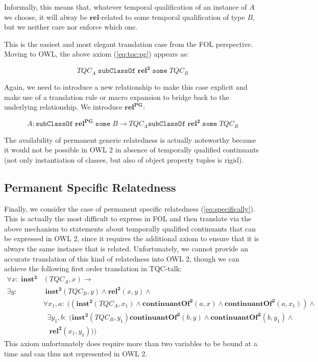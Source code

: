 \documentclass{ao2e}
\newcommand{\mirel}[1]{\ensuremath{\mathrm{\mathbf{#1}}}}
\newcommand{\mclass}[1]{\ensuremath{\mathit{#1}}}
\newcommand{\mrel}[2]{\mirel{#1^#2}}
\newcommand{\mrelb}[1]{\mrel{#1}{2}}
\newcommand{\TQC}[1]{\ensuremath{TQC_{\mclass{#1}}}}
\newcommand{\mrelpg}[1]{\mrel{#1}{{PG}}}
\begin{document}
Informally, this means that, whatever temporal qualification of an instance of
\mclass{A} we choose, it will alway be \mirel{rel}-related to some temporal
qualification of type \mclass{B}, but we neither care nor enforce which one.

This is the easiest and most elegant translation case from the FOL perspective.
Moving to OWL, the above axiom (\ref{eq:tqc:pg}) appears as: 

\begin{equation}
\TQC{A}\;\mathtt{subClassOf}\;\mrelb{rel}\;\mathtt{some}\;\TQC{B}  
\end{equation}

Again, we need to introduce a new relationship to make this case explicit and
make use of a translation rule or macro expansion to bridge back to the
underlying relationship. We introduce \mrelpg{rel}:

\begin{equation}
\mclass{A};\mathtt{subClassOf}\;\mrelpg{rel}\;\mathtt{some}\;\mclass{B} \rightarrow  \TQC{A}
\mathtt{subClassOf}\;\mrelb{rel}\;\mathtt{some}\;\TQC{B}
\end{equation}

The availability of permanent generic relatedness is actually noteworthy because
it would not be possible in OWL 2 in absence of temporally qualified
continuants (not only instantiation of classes, but also of object property
tuples is rigid). 

\subsection{Permanent Specific Relatedness}
Finally, we consider the case of permanent specific relatedness
(\ref{eq:specifically}). This is
actually the most difficult to express in FOL and then translate via the above
mechanism to statements about temporally qualified continuants that can be
expressed in OWL 2, since it requires the additional axiom to ensure that it is
always the same instance that is related. Unfortunately, we cannot provide an
accurate translation of this kind of relatedness into OWL 2, though we can
achieve the following first order translation in TQC-talk:
\begin{equation}
\begin{split}
\forall x:\; \mrelb{inst}&(\TQC{A},x) \rightarrow \\
 \exists y:&\;\mrelb{inst}(\TQC{B},y) \wedge \mrelb{rel}(x,y)\wedge\\
 & \forall x_1,a:\; ((\mrelb{inst}(\TQC{A},x_1) \wedge 
\mrelb{continuantOf}(a,x) \wedge \mrelb{continuantOf}(a,x_1))\wedge\\
&\;\;\exists y_1,b:\;(\mrelb{inst}(\TQC{B},y_1) \mrelb{continuantOf}(b,y)  
\wedge \mrelb{continuantOf}(b,y_1) \wedge\\&\;\;\;\mrelb{rel}(x_1,y_1)))
\end{split}
\end{equation}
This axiom unfortunately does require more than two variables to be bound at a
time and can thus not represented in OWL 2.
\end{document}
